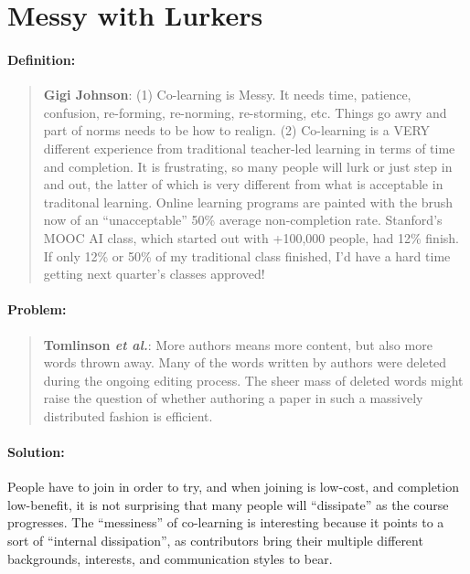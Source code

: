 \section{Messy with Lurkers}
\paragraph{Definition:}

\begin{quote}
\textbf{Gigi Johnson}: (1) Co-learning is Messy. It needs time, patience,
confusion, re-forming, re-norming, re-storming, etc. Things go awry and
part of norms needs to be how to realign. (2) Co-learning is a VERY
different experience from traditional teacher-led learning in terms of
time and completion. It is frustrating, so many people will lurk or just
step in and out, the latter of which is very different from what is
acceptable in traditonal learning. Online learning programs are painted
with the brush now of an ``unacceptable'' 50\% average non-completion
rate. Stanford's MOOC AI class, which started out with +100,000 people,
had 12\% finish. If only 12\% or 50\% of my traditional class finished,
I'd have a hard time getting next quarter's classes approved!
\end{quote}

\paragraph{Problem:}

\begin{quote}
\textbf{Tomlinson \emph{et al.}}: More authors means more content, but
also more words thrown away. Many of the words written by authors were
deleted during the ongoing editing process. The sheer mass of deleted
words might raise the question of whether authoring a paper in such a
massively distributed fashion is efficient.
\end{quote}

\paragraph{Solution:} People have to join in order to try, and when joining
is low-cost, and completion low-benefit, it is not surprising that many
people will ``dissipate'' as the course progresses. The ``messiness'' of
co-learning is interesting because it points to a sort of ``internal
dissipation'', as contributors bring their multiple different
backgrounds, interests, and communication styles to bear.

